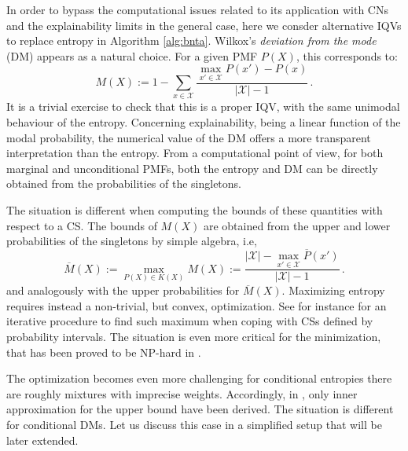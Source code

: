 \documentclass[runningheads]{llncs}
\begin{document}
In order to bypass the computational issues related to its application with CNs and the explainability limits in the general case, here we consder alternative IQVs to replace entropy in Algorithm \ref{alg:bnta}. Wilkox's \emph{deviation from the mode} (DM) appears as a natural choice. For a given PMF $P(X)$, this corresponds to:
\begin{equation}
M(X):=1-\sum_{x\in\mathcal{X}} \frac{\max_{x'\in\mathcal{X}} P(x') - P(x)}{|\mathcal{X}|-1}\,.
\end{equation}
It is a trivial exercise to check that this is a proper IQV, with the same unimodal behaviour of the entropy. Concerning explainability, being a linear function of the modal probability, the numerical value of the DM offers a more transparent interpretation than the entropy. From a computational point of view, for both marginal and unconditional PMFs, both the entropy and DM can be directly obtained from the probabilities of the singletons. 

The situation is different when computing the bounds of these quantities with respect to a CS. The bounds of $M(X)$ are obtained from the upper and lower probabilities of the singletons by simple algebra, i.e,
\begin{equation}
\overline{M}(X):=
\max_{P(X)\in K(X)} M(X):=\frac{|\mathcal{X}|-\max_{x'\in\mathcal{X}} \overline{P}(x')}{|\mathcal{X}|-1}\,.
\end{equation}
and analogously with the upper probabilities for $\overline{M}(X)$. Maximizing entropy requires instead a non-trivial, but convex, optimization. See for instance \cite{abellan2003maximum} for an iterative procedure to find such maximum when coping with CSs defined by probability intervals. The situation is even more critical for the minimization, that has been proved to be NP-hard in \cite{xiang2006estimating}.

The optimization becomes even more challenging for conditional entropies there are roughly mixtures with imprecise weights. Accordingly, in \cite{mangili2017b}, only inner approximation for the upper bound have been derived. The situation is different for conditional DMs. Let us discuss this case in a simplified setup that will be later extended.
\end{document}
